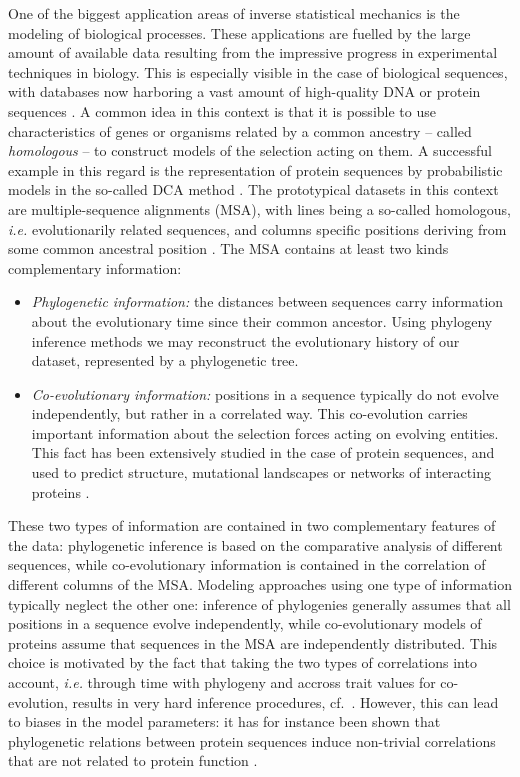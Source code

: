 \documentclass[preprint,amsmath,amssymb,superscriptaddress,showpacs,pre]{revtex4-1}
\begin{document}
One of the biggest application areas of inverse statistical mechanics is the modeling of biological processes.
These applications are fuelled by the large amount of available data resulting from the impressive progress in experimental techniques in biology. 
This is especially visible in the case of biological sequences,  with databases now harboring a vast amount of high-quality DNA or protein sequences \cite{sayers_genbank_2019,uniprotconsortium_uniprot_2018}.
A common idea in this context is that it is possible to use characteristics of genes or organisms related by a common ancestry -- called \emph{homologous} -- to construct models of the selection acting on them. 
A successful example in this regard is the representation of protein sequences by probabilistic models in the so-called DCA method \cite{levy_potts_2017,cocco_inverse_2018}. 
The prototypical datasets in this context are multiple-sequence alignments (MSA), with lines being a so-called homologous, {\em i.e.} evolutionarily related sequences, and columns specific positions deriving from some common ancestral position \cite{durbin1998biological}.  
The MSA contains at least two kinds complementary information:
\begin{itemize}
    \item {\it Phylogenetic information:} the distances between sequences carry information about the evolutionary time since their common ancestor. Using phylogeny inference methods \cite{felsenstein_phylogenies_1988,felsenstein_joseph_inferring_2003} we may reconstruct the evolutionary history of our dataset, represented by a phylogenetic tree.  
    \item {\it Co-evolutionary information:} positions in a sequence typically do not evolve independently, but rather in a correlated way. This co-evolution carries important information about the selection forces acting on evolving entities. This fact has been extensively studied in the case of protein sequences, and used to predict structure, mutational landscapes or networks of interacting proteins \cite{levy_potts_2017,cocco_inverse_2018}.  
\end{itemize}
These two types of information are contained in two complementary features of the data: phylogenetic inference is based on the comparative analysis of different sequences, while co-evolutionary information is contained in the correlation of different columns of the MSA. 
Modeling approaches using one type of information typically neglect the other one: inference of phylogenies generally assumes that all positions in a sequence evolve independently, while co-evolutionary models of proteins assume that sequences in the MSA are independently distributed. 
This choice is motivated by the fact that taking the two types of correlations into account, \emph{i.e.} through time with phylogeny and accross trait values for co-evolution, results in very hard inference procedures, cf.~\cite{obermayer2014inverse,rodriguez2019toward}. 
However, this can lead to biases in the model parameters: it has for instance been shown that phylogenetic relations between protein sequences induce non-trivial correlations that are not related to protein function \cite{qin_power_2018,horta2020phylogenetic}. 
\end{document}
